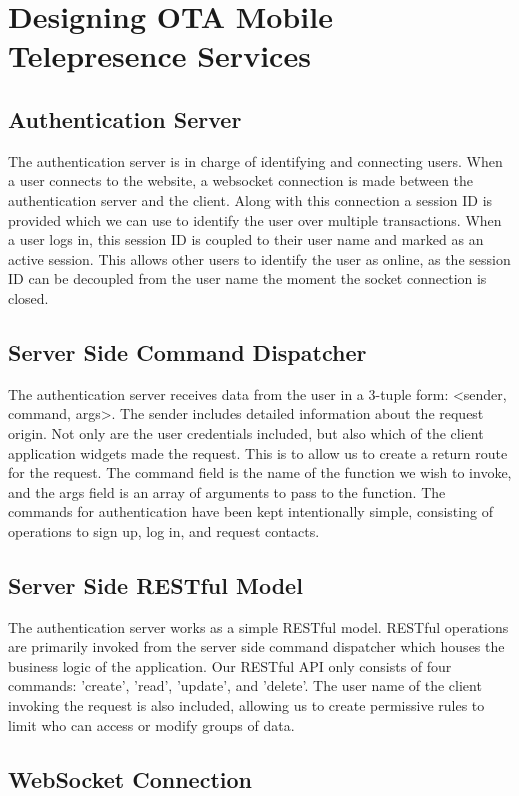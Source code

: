 \documentclass[a4paper,12pt]{report}
\begin{document}
\chapter{Designing OTA Mobile Telepresence Services}
\section{Authentication Server}
The authentication server is in charge of identifying and connecting users. When a user connects to the website, a websocket connection is made between the authentication server and the client. Along with this connection a session ID is provided which we can use to identify the user over multiple transactions. When a user logs in, this session ID is coupled to their user name and marked as an active session. This allows other users to identify the user as online, as the session ID can be decoupled from the user name the moment the socket connection is closed.
\section{Server Side Command Dispatcher}
The authentication server receives data from the user in a 3-tuple form: <sender, command, args>. The sender includes detailed information about the request origin. Not only are the user credentials included, but also which of the client application widgets made the request. This is to allow us to create a return route for the request. The command field is the name of the function we wish to invoke, and the args field is an array of arguments to pass to the function. The commands for authentication have been kept intentionally simple, consisting of operations to sign up, log in, and request contacts. 
\section{Server Side RESTful Model}
The authentication server works as a simple RESTful model. RESTful operations are primarily invoked from the server side command dispatcher which houses the business logic of the application. Our RESTful API only consists of four commands: 'create', 'read', 'update', and 'delete'. The user name of the client invoking the request is also included, allowing us to create permissive rules to limit who can access or modify groups of data.
\section{WebSocket Connection}
\end{document}
